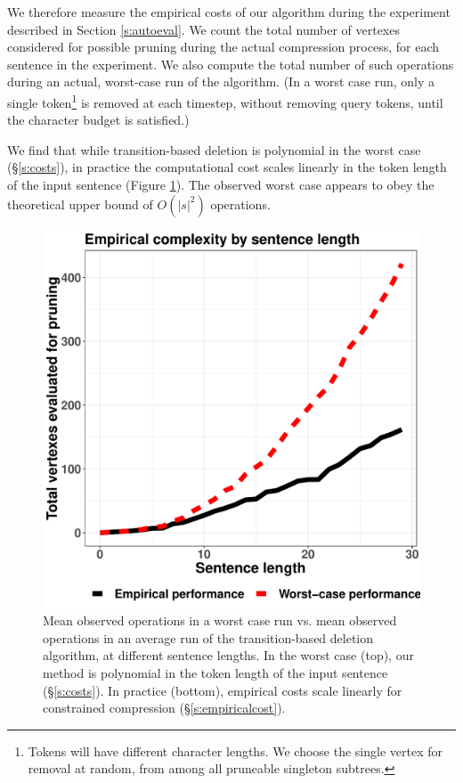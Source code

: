 \documentclass[11pt,a4paper]{article}
\newcommand{\ahcomment}[1]{\textcolor{blue}{[#1 -AH]}}
\begin{document}
We therefore measure the empirical costs of our algorithm during the experiment described in Section \ref{s:autoeval}. We count the total number of vertexes considered for possible pruning during the actual compression process, for each sentence in the experiment. We also compute the total number of such operations during an actual, worst-case run of the algorithm. (In a worst case run, only a single token\footnote{Tokens will have different character lengths. We choose the single vertex for removal at random, from among all pruneable singleton subtrees.} is removed at each timestep, without removing query tokens, until the character budget is satisfied.) 

We find that while transition-based deletion is polynomial in the worst case (\S\ref{s:costs}), in practice the computational cost scales linearly in the token length of the input sentence (Figure \ref{f:example}). The observed worst case appears to obey the theoretical upper bound of $O(|s|^2)$ operations.

\begin{figure}[htb!]
\centering
\includegraphics[width=.4\textwidth]{observed.pdf}
\caption{Mean observed operations in a worst case run vs. mean observed operations in an average run of the transition-based deletion algorithm, at different sentence lengths. In the worst case (top), our method is polynomial in the token length of the input sentence (\S\ref{s:costs}). In practice (bottom), empirical costs scale linearly for constrained compression (\S\ref{s:empiricalcost}).}
\label{f:example}
\end{figure}


\end{document}
